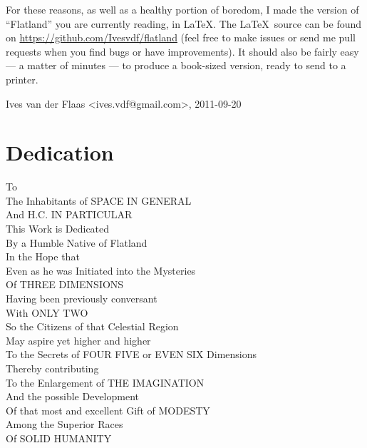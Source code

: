\documentclass[12pt, a4paper, oneside]{memoir}
\begin{document}
For these reasons, as well as a healthy portion of boredom, I made the version
of ``Flatland'' you are currently reading, in \LaTeX. The \LaTeX\ source can be
found on \url{https://github.com/Ivesvdf/flatland} (feel free to make issues
or send me pull requests when you find bugs or have improvements). It should
also be fairly easy --- a matter of minutes --- to produce a book-sized
version, ready to send to a printer. 

\vspace{1cm}

\hfill Ives van der Flaas <ives.vdf@gmail.com>, 2011-09-20


\chapter*{Dedication}

\begin{center}
To\\
The Inhabitants of SPACE IN GENERAL\\
And H.C. IN PARTICULAR\\
This Work is Dedicated\\
By a Humble Native of Flatland\\
In the Hope that\\
Even as he was Initiated into the Mysteries\\
Of THREE DIMENSIONS\\
Having been previously conversant\\
With ONLY TWO\\
So the Citizens of that Celestial Region\\
May aspire yet higher and higher\\
To the Secrets of FOUR FIVE or EVEN SIX Dimensions\\
Thereby contributing\\
To the Enlargement of THE IMAGINATION\\
And the possible Development\\
Of that most and excellent Gift of MODESTY\\
Among the Superior Races\\
Of SOLID HUMANITY\\
\end{center}
\end{document}
